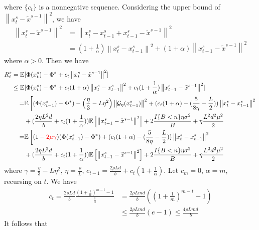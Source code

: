 \documentclass{article}
\newcommand*{\G}{\mathcal{G}}
\newcommand*{\E}{\mathbb{E}}
\newcommand{\norm}[1]{\left\lVert#1\right\rVert}
\theoremstyle{definition}
\theoremstyle{remark}
\begin{document}
{\begin{equation}
 \end{equation}
 where $\{c_t\}$ is a nonnegative sequence. Considering the upper bound of $\norm{x_{t}^s - \tilde{x}^{s-1}}^2$, we have
 \begin{equation}
 \begin{split}
  \norm{x_{t}^s - \tilde{x}^{s-1}}^2 & = \norm{x_{t}^s - x_{t-1}^s + x_{t-1}^s - \tilde{x}^{s-1}}^2 \\
  & = (1+\frac{1}{\alpha}) \norm{x_{t}^s - x_{t-1}^s}^2 + (1+\alpha) \norm{x_{t-1}^s - \tilde{x}^{s-1}}^2
 \end{split}
 \end{equation}
 where $\alpha > 0$. Then we have 
 \begin{align} 
R_t^s = \E&[\Phi({x}_{t}^s) -\Phi^*+ c_t \norm{x_{t}^s - \tilde{x}^{s-1}}^2] \notag\\
\leq \E&[\Phi({x}_{t}^s)-\Phi^* + c_t (1+{\alpha}) \norm{x_{t}^s - x_{t-1}^s}^2 + c_t (1+\frac{1}{\alpha}) \norm{x_{t-1}^s - \tilde{x}^{s-1}}^2]\\
=& \E\left[(\Phi({x}_{t-1}^s)-\Phi^*) - \left(\frac{\eta}{3}-L\eta^2\right)\norm{\G_{\eta}(x_{t-1}^s)}^2  + (c_t (1+{\alpha})-(\frac{5}{8\eta} - \frac{L}{2}))\norm{{x}_t^s-x_{t-1}^s}^2 \right. \\
 & + (\frac{2\eta L^2 d}{b}+c_t (1+\frac{1}{\alpha}))\E\left[\norm{x_{t-1}^s-\widetilde{x}^{s-1}}^2\right]+ 2\frac{I\{B < n\}\eta \sigma ^2}{B}+\eta \frac{L^2 d^2 \mu^2}{2}\\
=& \E\left[(1-{\color{red}{2\mu}{\gamma}})(\Phi({x}_{t-1}^s)-\Phi^*)  + (c_t (1+{\alpha})-(\frac{5}{8\eta} - \frac{L}{2}))\norm{{x}_t^s-x_{t-1}^s}^2 \right. \\
 & + (\frac{2\eta L^2 d}{b}+c_t (1+\frac{1}{\alpha}))\E\left[\norm{x_{t-1}^s-\widetilde{x}^{s-1}}^2\right]+ 2\frac{I\{B < n\}\eta \sigma ^2}{B}+\eta \frac{L^2 d^2 \mu^2}{2}
 \end{align}
 where $\gamma = \frac{\eta}{3}-L\eta^2$, $\eta = \frac{\rho}{L}$, $c_{t-1} = \frac{2\rho L d}{b}+c_t (1+\frac{1}{\alpha})$. Let $c_m=0$, $\alpha = m$, recursing on $t$. We have 
 \begin{equation}
 \begin{split}
 c_t = \frac{2\rho L d}{b}\frac{(1+\frac{1}{\alpha})^{m-t}-1}{\frac{1}{\alpha}} &= \frac{2\rho Lm d}{b} \left((1+\frac{1}{m})^{m-t}-1\right)\\
 &\leq \frac{2\rho Lm d}{b} (e-1) \leq \frac{4\rho Lmd}{b}
 \end{split}
 \end{equation}
 It follows that 
 \begin{equation}

\end{equation}}
\end{document}
